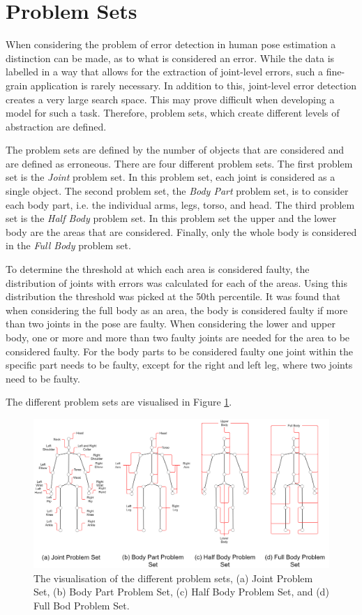 \section{Problem Sets}
\label{sec:problem_set}

When considering the problem of error detection in human pose estimation a distinction can be made, as to what is considered an error. While the data is labelled in a way that allows for the extraction of joint-level errors, such a fine-grain application is rarely necessary. In addition to this, joint-level error detection creates a very large search space. This may prove difficult when developing a model for such a task. Therefore, problem sets, which create different levels of abstraction are defined.

The problem sets are defined by the number of objects that are considered and are defined as erroneous. There are four different problem sets. The first problem set is the \textit{Joint} problem set. In this problem set, each joint is considered as a single object. The second problem set, the \textit{Body Part} problem set, is to consider each body part, i.e. the individual arms, legs, torso, and head. The third problem set is the \textit{Half Body} problem set. In this problem set the upper and the lower body are the areas that are considered. Finally, only the whole body is considered in the \textit{Full Body} problem set.

To determine the threshold at which each area is considered faulty, the distribution of joints with errors was calculated for each of the areas. Using this distribution the threshold was picked at the 50th percentile. It was found that when considering the full body as an area, the body is considered faulty if more than two joints in the pose are faulty. When considering the lower and upper body, one or more and more than two faulty joints are needed for the area to be considered faulty. For the body parts to be considered faulty one joint within the specific part needs to be faulty, except for the right and left leg, where two joints need to be faulty.

The different problem sets are visualised in Figure \ref{fig:ps}.

\begin{figure}[ht]
  \centering
  \includegraphics[width=\textwidth]{figures/HPE/problem_sets.png}
  \caption[Visualisation of the Problemsets]{The visualisation of the different problem sets, (a) Joint Problem Set, (b) Body Part Problem Set, (c) Half Body Problem Set, and (d) Full Bod Problem Set.}
  \label{fig:ps}
\end{figure}
